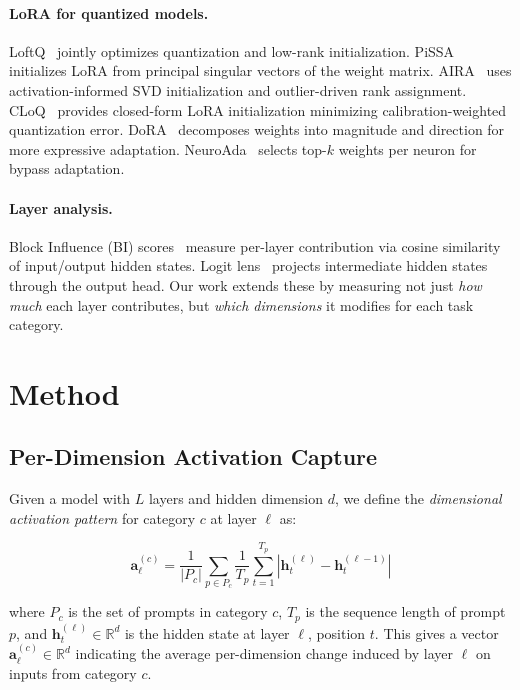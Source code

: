 \documentclass[11pt,a4paper]{article}
\begin{document}
\paragraph{LoRA for quantized models.} LoftQ~\citep{li2024loftq} jointly optimizes quantization and low-rank initialization. PiSSA~\citep{meng2024pissa} initializes LoRA from principal singular vectors of the weight matrix. AIRA~\citep{li2025aira} uses activation-informed SVD initialization and outlier-driven rank assignment. CLoQ~\citep{bondarenko2025cloq} provides closed-form LoRA initialization minimizing calibration-weighted quantization error. DoRA~\citep{liu2024dora} decomposes weights into magnitude and direction for more expressive adaptation. NeuroAda~\citep{zhang2025neuroada} selects top-$k$ weights per neuron for bypass adaptation.

\paragraph{Layer analysis.} Block Influence (BI) scores~\citep{sun2024wanda} measure per-layer contribution via cosine similarity of input/output hidden states. Logit lens~\citep{nostalgebraist2020logitlens} projects intermediate hidden states through the output head. Our work extends these by measuring not just \emph{how much} each layer contributes, but \emph{which dimensions} it modifies for each task category.

\section{Method}

\subsection{Per-Dimension Activation Capture}

Given a model with $L$ layers and hidden dimension $d$, we define the \emph{dimensional activation pattern} for category $c$ at layer $\ell$ as:

\begin{equation}
\mathbf{a}^{(c)}_\ell = \frac{1}{|P_c|} \sum_{p \in P_c} \frac{1}{T_p} \sum_{t=1}^{T_p} \left| \mathbf{h}^{(\ell)}_t - \mathbf{h}^{(\ell-1)}_t \right|
\end{equation}

where $P_c$ is the set of prompts in category $c$, $T_p$ is the sequence length of prompt $p$, and $\mathbf{h}^{(\ell)}_t \in \mathbb{R}^d$ is the hidden state at layer $\ell$, position $t$. This gives a vector $\mathbf{a}^{(c)}_\ell \in \mathbb{R}^d$ indicating the average per-dimension change induced by layer $\ell$ on inputs from category $c$.
\end{document}
